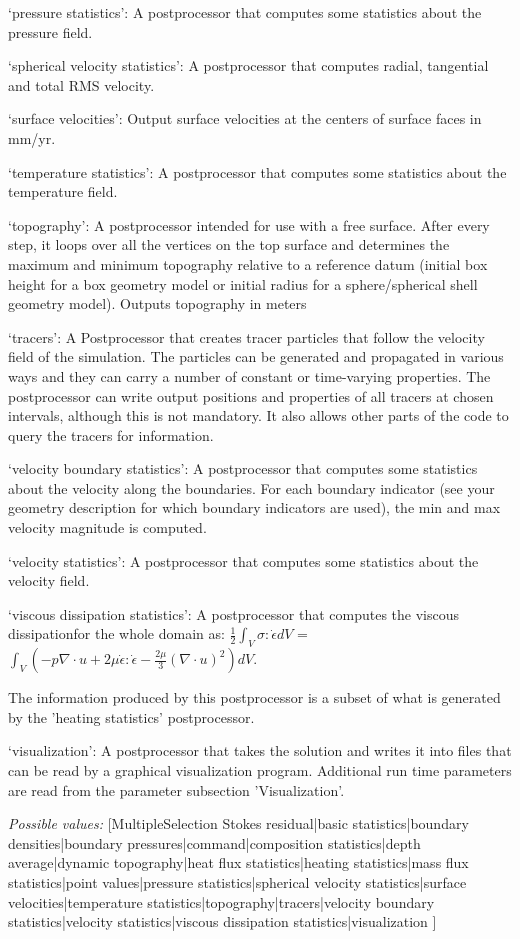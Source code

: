 \begin{itemize}
`pressure statistics': A postprocessor that computes some statistics about the pressure field.

`spherical velocity statistics': A postprocessor that computes radial, tangential and total RMS velocity.

`surface velocities': Output surface velocities at the centers of surface faces in mm/yr.

`temperature statistics': A postprocessor that computes some statistics about the temperature field.

`topography': A postprocessor intended for use with a free surface.  After every step, it loops over all the vertices on the top surface and determines the maximum and minimum topography relative to a reference datum (initial box height for a box geometry model or initial radius for a sphere/spherical shell geometry model).  Outputs topography in meters

`tracers': A Postprocessor that creates tracer particles that follow the velocity field of the simulation. The particles can be generated and propagated in various ways and they can carry a number of constant or time-varying properties. The postprocessor can write output positions and properties of all tracers at chosen intervals, although this is not mandatory. It also allows other parts of the code to query the tracers for information.

`velocity boundary statistics': A postprocessor that computes some statistics about the velocity along the boundaries. For each boundary indicator (see your geometry description for which boundary indicators are used), the min and max velocity magnitude is computed.

`velocity statistics': A postprocessor that computes some statistics about the velocity field.

`viscous dissipation statistics': A postprocessor that computes the viscous dissipationfor the whole domain as: $\frac{1}{2} \int_{V} \sigma : \dot{\epsilon}dV$ = $\int_{V} (-p\nabla \cdot u+2\mu\dot{\epsilon}:\dot{\epsilon} - \frac{2\mu}{3}(\nabla\cdot u)^{2}) dV$.

The information produced by this postprocessor is a subset of what is generated by the 'heating statistics' postprocessor.

`visualization': A postprocessor that takes the solution and writes it into files that can be read by a graphical visualization program. Additional run time parameters are read from the parameter subsection 'Visualization'.


{\it Possible values:} [MultipleSelection Stokes residual|basic statistics|boundary densities|boundary pressures|command|composition statistics|depth average|dynamic topography|heat flux statistics|heating statistics|mass flux statistics|point values|pressure statistics|spherical velocity statistics|surface velocities|temperature statistics|topography|tracers|velocity boundary statistics|velocity statistics|viscous dissipation statistics|visualization ]
\end{itemize}



